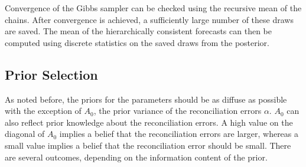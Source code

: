 \documentclass[a4paper,fleqn,11pt]{article}
\begin{document}
\begin{enumerate}
\end{enumerate}

\noindent Convergence of the Gibbs sampler can be checked using the recursive mean of the chains. After convergence is achieved, a sufficiently large number of these draws are saved. The mean of the hierarchically consistent forecasts can then be computed using discrete statistics on the saved draws from the posterior.\\

\subsection{Prior Selection}
As noted before, the priors for the parameters should be as diffuse as possible with the exception of $A_0$, the prior variance of the reconciliation errors $\alpha$. $A_0$ can also reflect prior knowledge about the reconciliation errors. A high value on the diagonal of $A_0$ implies a belief that the reconciliation errors are larger, whereas a small value implies a belief that the reconciliation error should be small. There are several outcomes, depending on the information content of the prior.
\end{document}
